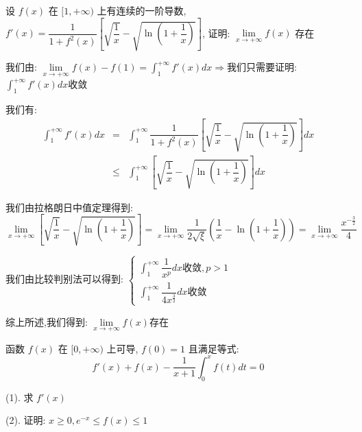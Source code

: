 \begin{example}[][Exam: 36.3.11]
	设 $f(x)$ 在 $[1,+\infty)$ 上有连续的一阶导数, $f'(x)=\dfrac{1}{1+f^{2}(x)}\left[\sqrt{\dfrac{1}{x}}-\sqrt{\ln(1+\dfrac{1}{x})} \right]$,
	证明: $\lim\limits_{x\to +\infty}f(x)$ 存在

\end{example}
\begin{solution}

	我们由:  $\lim\limits_{x\to +\infty}f(x)-f(1)=\int_{1}^{+\infty}f'(x)dx\Rightarrow $我们只需要证明:  $\int_{1}^{+\infty}f'(x)dx$收敛
	
	我们有:  
	\begin{eqnarray*}
		\int_{1}^{+\infty}f'(x)dx&=&\int_{1}^{+\infty}\dfrac{1}{1+f^{2}(x)}\left[\sqrt{\dfrac{1}{x}}-\sqrt{\ln(1+\dfrac{1}{x})} \right]dx\\
		&\leq&\int_{1}^{+\infty}\left[\sqrt{\dfrac{1}{x}}-\sqrt{\ln(1+\dfrac{1}{x})} \right]dx
	\end{eqnarray*}
	
	我们由拉格朗日中值定理得到:  
	$$\lim\limits_{x\to+\infty}\left[\sqrt{\dfrac{1}{x}}-\sqrt{\ln(1+\dfrac{1}{x})} \right]=\lim\limits_{x\to+\infty}\dfrac{1}{2\sqrt{\xi}}\left(\dfrac{1}{x}-\ln(1+\dfrac{1}{x}) \right)=\lim\limits_{x\to+\infty}\dfrac{x^{-\frac{3}{2}}}{4}$$
	
	我们由比较判别法可以得到:  $\left\lbrace 
	\begin{array}{l}
		\int_{1}^{+\infty}\dfrac{1}{x^p}dx\text{收敛},p>1\\
		\int_{1}^{+\infty}\dfrac{1}{4x^{\frac{3}{2}}}dx\text{收敛}
	\end{array}
	\right. $
	
	综上所述,我们得到:  $\lim\limits_{x\to +\infty}f(x)$存在
\end{solution}

\begin{example}[][Exam: 36.3.12]
	函数 $f(x)$ 在 $[0,+\infty)$ 上可导, $f(0)=1$ 且满足等式:  
$$f'(x)+f(x)-\dfrac{1}{x+1}\int_{0}^{x}f(t)dt=0$$

(1). 求 $f'(x)$

(2). 证明: $x\geq 0, e^{-x}\leq f(x)\leq 1$

\end{example}

